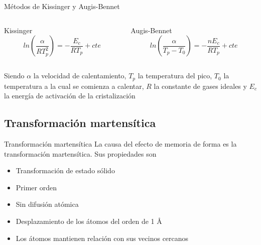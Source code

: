 \documentclass[11pt]{beamer}
\begin{document}
		\begin{frame}{Métodos de Kissinger y Augis-Bennet}
			\begin{columns}
				\begin{column}{.49\textwidth}
					Kissinger \\ 
					\begin{equation}
						ln(\frac{\alpha}{R T_p^2}) = -\frac{E_c}{RT_p} + cte
					\end{equation}
				\end{column}
				\begin{column}{.49\textwidth}
					Augis-Bennet\\
					\begin{equation}
						ln(\frac{\alpha}{T_p - T_0}) = -\frac{n E_c}{RT_p} + cte
					\end{equation}
				\end{column}
			\end{columns}
			Siendo $\alpha$ la velocidad de calentamiento, $T_p$ la temperatura del pico, $T_0$ la temperatura a la cual se comienza a calentar, $R$ la constante de gases ideales y $E_c$ la energía de activación de la cristalización
		\end{frame}	
		
		
	\subsection{Transformación martensítica}
		\begin{frame}{Transformación martensítica}
			La causa del efecto de memoria de forma es la transformación martensítica.
			Sus propiedades son
			\begin{itemize}
				\item Transformación de estado sólido
				\item Primer orden
				\item Sin difusión atómica
				\item Desplazamiento de los átomos del orden de 1 \AA
				\item Los átomos mantienen relación con sus vecinos cercanos
			\end{itemize}
		\end{frame}
		
\end{document}
